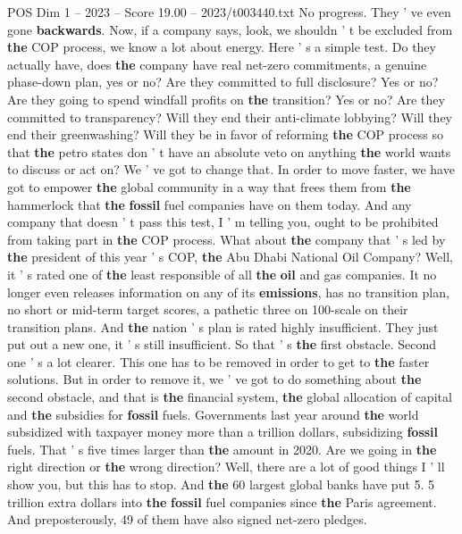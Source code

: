 \begin{textsample}{POS Dim 1 – 2023 – Score 19.00 – 2023/t003440.txt}
No progress.
They ' ve even gone \textbf{backwards}.
Now, if a company says, look, we shouldn ' t be excluded from \textbf{the} COP process, we know a lot about energy.
Here ' s a simple test.
Do they actually have, does \textbf{the} company have real net-zero commitments, a genuine phase-down plan, yes or no?
Are they committed to full disclosure?
Yes or no?
Are they going to spend windfall profits on \textbf{the} transition?
Yes or no?
Are they committed to transparency?
Will they end their anti-climate lobbying?
Will they end their greenwashing?
Will they be in favor of reforming \textbf{the} COP process so that \textbf{the} petro states don ' t have an absolute veto on anything \textbf{the} world wants to discuss or act on?
We ' ve got to change that.
In order to move faster, we have got to empower \textbf{the} global community in a way that frees them from \textbf{the} hammerlock that \textbf{the} \textbf{fossil} fuel companies have on them today.
And any company that doesn ' t pass this test, I ' m telling you, ought to be prohibited from taking part in \textbf{the} COP process.
What about \textbf{the} company that ' s led by \textbf{the} president of this year ' s COP, \textbf{the} Abu Dhabi National Oil Company?
Well, it ' s rated one of \textbf{the} least responsible of all \textbf{the} \textbf{oil} and gas companies.
It no longer even releases information on any of its \textbf{emissions}, has no transition plan, no short or mid-term target scores, a pathetic three on 100-scale on their transition plans.
And \textbf{the} nation ' s plan is rated highly insufficient.
They just put out a new one, it ' s still insufficient.
So that ' s \textbf{the} first obstacle.
Second one ' s a lot clearer.
This one has to be removed in order to get to \textbf{the} faster solutions.
But in order to remove it, we ' ve got to do something about \textbf{the} second obstacle, and that is \textbf{the} financial system, \textbf{the} global allocation of capital and \textbf{the} subsidies for \textbf{fossil} fuels.
Governments last year around \textbf{the} world subsidized with taxpayer money more than a trillion dollars, subsidizing \textbf{fossil} fuels.
That ' s five times larger than \textbf{the} amount in 2020.
Are we going in \textbf{the} right direction or \textbf{the} wrong direction?
Well, there are a lot of good things I ' ll show you, but this has to stop.
And \textbf{the} 60 largest global banks have put 5. 5 trillion extra dollars into \textbf{the} \textbf{fossil} fuel companies since \textbf{the} Paris agreement.
And preposterously, 49 of them have also signed net-zero pledges.

\end{textsample}
